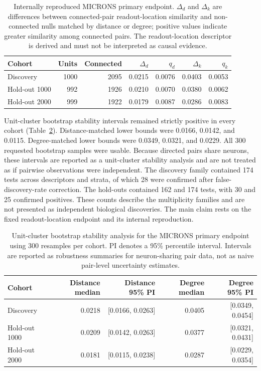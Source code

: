 \begin{table}[t]
\centering
\caption{Internally reproduced MICRONS primary endpoint. $\Delta_d$ and $\Delta_k$ are differences between connected-pair readout-location similarity and non-connected nulls matched by distance or degree; positive values indicate greater similarity among connected pairs. The readout-location descriptor is derived and must not be interpreted as causal evidence.}
\label{tab:microns-primary}
\small
\begin{tabular}{lrrrrrr}
\toprule
Cohort & Units & Connected & $\Delta_d$ & $q_d$ & $\Delta_k$ & $q_k$ \\
\midrule
Discovery & 1000 & 2095 & 0.0215 & 0.0076 & 0.0403 & 0.0053 \\
Hold-out 1000 & 992 & 1926 & 0.0210 & 0.0070 & 0.0380 & 0.0062 \\
Hold-out 2000 & 999 & 1922 & 0.0179 & 0.0087 & 0.0286 & 0.0083 \\
\bottomrule
\end{tabular}
\end{table}

Unit-cluster bootstrap stability intervals remained strictly positive in every
cohort (Table~\ref{tab:microns-bootstrap}). Distance-matched lower bounds were
0.0166, 0.0142, and 0.0115. Degree-matched lower bounds were 0.0349, 0.0321,
and 0.0229. All 300 requested bootstrap samples were usable. Because directed
pairs share neurons, these intervals are reported as a unit-cluster stability
analysis and are not treated as if pairwise observations were independent. The
discovery family contained 174 tests across descriptors and strata, of which
28 were confirmed after false-discovery-rate correction. The hold-outs
contained 162 and 174 tests, with 30 and 25 confirmed positives. These counts
describe the multiplicity families and are not presented as independent
biological discoveries. The main claim rests on the fixed readout-location
endpoint and its internal reproduction.

\begin{table}[t]
\centering
\caption{Unit-cluster bootstrap stability analysis for the MICRONS primary endpoint using 300 resamples per cohort. PI denotes a 95\% percentile interval. Intervals are reported as robustness summaries for neuron-sharing pair data, not as naive pair-level uncertainty estimates.}
\label{tab:microns-bootstrap}
\small
\begin{tabular}{lrrrr}
\toprule
Cohort & Distance median & Distance 95\% PI & Degree median & Degree 95\% PI \\
\midrule
Discovery & 0.0218 & [0.0166, 0.0263] & 0.0405 & [0.0349, 0.0454] \\
Hold-out 1000 & 0.0209 & [0.0142, 0.0263] & 0.0377 & [0.0321, 0.0431] \\
Hold-out 2000 & 0.0181 & [0.0115, 0.0238] & 0.0287 & [0.0229, 0.0354] \\
\bottomrule
\end{tabular}
\end{table}

